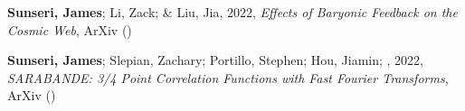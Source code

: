 \item \textbf{Sunseri, James}; Li, Zack; \& Liu, Jia, 2022, \emph{Effects of Baryonic Feedback on the Cosmic Web}, ArXiv ()

\item \textbf{Sunseri, James}; Slepian, Zachary; Portillo, Stephen; Hou, Jiamin; \etal, 2022, \emph{SARABANDE: 3/4 Point Correlation Functions with Fast Fourier Transforms}, ArXiv ()